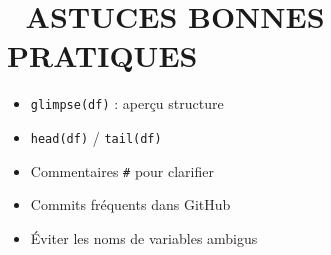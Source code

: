 \documentclass[
  8pt,
  letterpaper,
  DIV=11,
  numbers=noendperiod]{scrartcl}
\providecommand{\tightlist}{%
  \setlength{\itemsep}{0pt}\setlength{\parskip}{0pt}}
\begin{document}
\section{🧠 ASTUCES BONNES PRATIQUES}\label{astuces-bonnes-pratiques}

\begin{itemize}
\tightlist
\item
  \texttt{glimpse(df)} : aperçu structure
\item
  \texttt{head(df)} / \texttt{tail(df)}
\item
  Commentaires \texttt{\#} pour clarifier
\item
  Commits fréquents dans GitHub
\item
  Éviter les noms de variables ambigus
\end{itemize}
\end{document}
